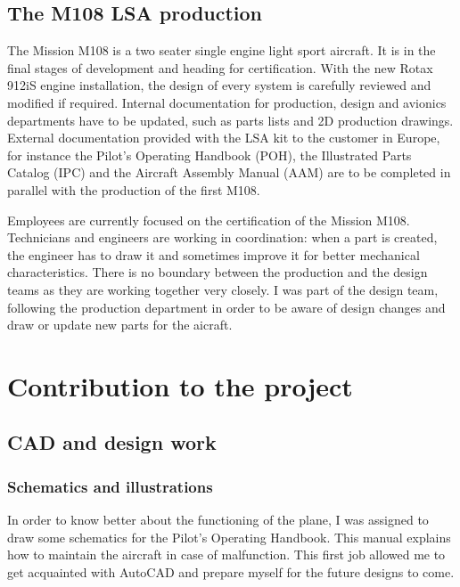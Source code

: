 \documentclass[11pt,a4paper]{article}
\begin{document}
\subsection{The M108 LSA production}
The Mission M108 is a two seater single engine light sport aircraft. It is in the final stages of development and heading for certification. With the new Rotax 912iS engine installation, the design of every system is carefully reviewed and modified if required. Internal documentation for production, design and avionics departments have to be updated, such as parts lists and 2D production drawings. External documentation provided with the LSA kit to the customer in Europe, for instance the Pilot's Operating Handbook (POH), the Illustrated Parts Catalog (IPC) and the Aircraft Assembly Manual (AAM) are to be completed in parallel with the production of the first M108.

\bigskip

Employees are currently focused on the certification of the Mission M108. Technicians and engineers are working in coordination: when a part is created, the engineer has to draw it and sometimes improve it for better mechanical characteristics. There is no boundary between the production and the design teams as they are working together very closely. I was part of the design team, following the production department in order to be aware of design changes and draw or update new parts for the aicraft.

\newpage

\section{Contribution to the project}
\subsection{CAD and design work}
\subsubsection{Schematics and illustrations}

In order to know better about the functioning of the plane, I was assigned to draw some schematics for the Pilot's Operating Handbook. This manual explains how to maintain the aircraft in case of malfunction. This first job allowed me to get acquainted with AutoCAD and prepare myself for the future designs to come. 
\end{document}
